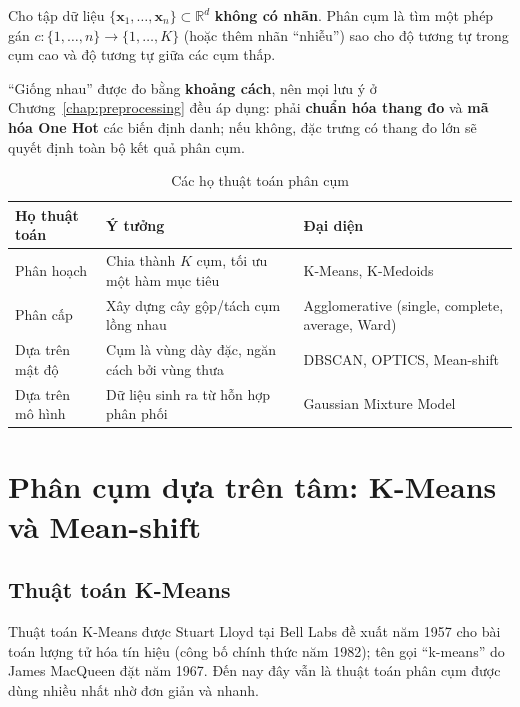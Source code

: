 \begin{definition}
Cho tập dữ liệu $\{\mathbf{x}_1, \dots, \mathbf{x}_n\} \subset \mathbb{R}^d$ \textbf{không có nhãn}. Phân cụm là tìm một phép gán $c: \{1, \dots, n\} \to \{1, \dots, K\}$ (hoặc thêm nhãn ``nhiễu'') sao cho độ tương tự trong cụm cao và độ tương tự giữa các cụm thấp.
\end{definition}

``Giống nhau'' được đo bằng \textbf{khoảng cách}, nên mọi lưu ý ở Chương~\ref{chap:preprocessing} đều áp dụng: phải \textbf{chuẩn hóa thang đo} và \textbf{mã hóa One Hot} các biến định danh; nếu không, đặc trưng có thang đo lớn sẽ quyết định toàn bộ kết quả phân cụm.

\begin{table}[H]
\centering
\begin{tabular}{|p{3cm}|p{5.5cm}|p{4.5cm}|}
\hline
\textbf{Họ thuật toán} & \textbf{Ý tưởng} & \textbf{Đại diện} \\
\hline
Phân hoạch & Chia thành $K$ cụm, tối ưu một hàm mục tiêu & K-Means, K-Medoids \\ \hline
Phân cấp & Xây dựng cây gộp/tách cụm lồng nhau & Agglomerative (single, complete, average, Ward) \\ \hline
Dựa trên mật độ & Cụm là vùng dày đặc, ngăn cách bởi vùng thưa & DBSCAN, OPTICS, Mean-shift \\ \hline
Dựa trên mô hình & Dữ liệu sinh ra từ hỗn hợp phân phối & Gaussian Mixture Model \\ \hline
\end{tabular}
\caption{Các họ thuật toán phân cụm}
\end{table}

\section{Phân cụm dựa trên tâm: K-Means và Mean-shift}
\label{sec:centroid-clustering}

\subsection{Thuật toán K-Means}

Thuật toán K-Means được Stuart Lloyd tại Bell Labs đề xuất năm 1957 cho bài toán lượng tử hóa tín hiệu (công bố chính thức năm 1982); tên gọi ``k-means'' do James MacQueen đặt năm 1967. Đến nay đây vẫn là thuật toán phân cụm được dùng nhiều nhất nhờ đơn giản và nhanh.

